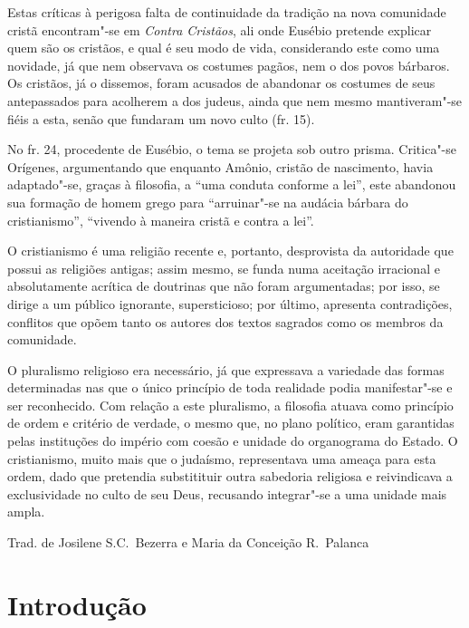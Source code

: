Estas críticas à perigosa falta de continuidade da tradição na nova
comunidade cristã encontram"-se em \textit{Contra Cristãos}, ali onde
Eusébio pretende explicar quem são os cristãos, e qual é seu modo de
vida, considerando este como uma novidade,
já que nem observava os costumes pagãos, nem o dos povos bárbaros. Os
cristãos, já o dissemos, foram acusados de abandonar os costumes de
seus antepassados
para acolherem a dos judeus, ainda que nem mesmo mantiveram"-se fiéis a
esta, senão que fundaram um novo culto (fr. 15).

No fr. 24, procedente de Eusébio, o tema se projeta sob outro
prisma. Critica"-se Orígenes, argumentando que enquanto Amônio, cristão
de nascimento, havia adaptado"-se, graças à filosofia, a “uma conduta
conforme a lei”,
este abandonou sua formação de homem grego para “arruinar"-se na audácia
bárbara do cristianismo'',
“vivendo à maneira cristã e contra a lei”.

O cristianismo é uma religião
recente e, portanto, desprovista da autoridade que possui as religiões
antigas; assim mesmo, se funda numa aceitação irracional e
absolutamente acrítica de doutrinas que não foram argumentadas; por
isso, se dirige a um público ignorante, supersticioso;  por último,
apresenta contradições, conflitos que opõem tanto os autores dos textos
sagrados como os membros da comunidade.

O pluralismo religioso era necessário, já que
expressava a variedade das formas determinadas nas que o único
princípio de toda realidade podia manifestar"-se e ser reconhecido. Com
relação a este pluralismo, a filosofia atuava como princípio de ordem e
critério de verdade, o mesmo que, no plano político, eram garantidas pelas 
instituções do império com coesão e unidade do organograma do Estado. O
cristianismo, muito mais que o judaísmo, representava uma ameaça para
esta ordem, dado que pretendia substitituir  outra sabedoria religiosa
e reivindicava a exclusividade no culto de seu Deus, recusando
integrar"-se a uma unidade mais ampla.
\bigskip

\hfill Trad. de Josilene S.C.~Bezerra e Maria da Conceição R.~Palanca





\section{Introdução}

